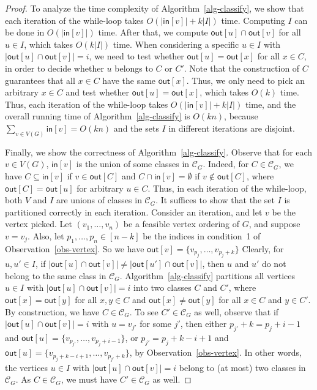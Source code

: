 \begin{proof}
To analyze the time complexity of Algorithm~\ref{alg-classify}, we show that each iteration of the while-loop takes $O(|\mathsf{in}[v]|+k|I|)$ time.
Computing $I$ can be done in $O(|\mathsf{in}[v]|)$ time.
After that, we compute $\mathsf{out}[u] \cap \mathsf{out}[v]$ for all $u \in I$, which takes $O(k|I|)$ time.
When considering a specific $u \in I$ with $|\mathsf{out}[u] \cap \mathsf{out}[v]| = i$, we need to test whether $\mathsf{out}[u] = \mathsf{out}[x]$ for all $x \in C$, in order to decide whether $u$ belongs to $C$ or $C'$.
Note that the construction of $C$ guarantees that all $x \in C$ have the same $\mathsf{out}[x]$.
Thus, we only need to pick an arbitrary $x \in C$ and test whether $\mathsf{out}[u] = \mathsf{out}[x]$, which takes $O(k)$ time.
Thus, each iteration of the while-loop takes $O(|\mathsf{in}[v]|+k|I|)$ time, and the overall running time of Algorithm~\ref{alg-classify} is $O(kn)$, because $\sum_{v \in V(G)} \mathsf{in}[v] = O(kn)$ and the sets $I$ in different iterations are disjoint.

Finally, we show the correctness of Algorithm~\ref{alg-classify}.
Observe that for each $v \in V(G)$, $\mathsf{in}[v]$ is the union of some classes in $\mathcal{C}_G$.
Indeed, for $C \in \mathcal{C}_G$, we have $C \subseteq \mathsf{in}[v]$ if $v \in \mathsf{out}[C]$ and $C \cap \mathsf{in}[v] = \emptyset$ if $v \not\in \mathsf{out}[C]$, where $\mathsf{out}[C] = \mathsf{out}[u]$ for arbitrary $u \in C$.
Thus, in each iteration of the while-loop, both $V$ and $I$ are unions of classes in $\mathcal{C}_G$.
It suffices to show that the set $I$ is partitioned correctly in each iteration.
Consider an iteration, and let $v$ be the vertex picked.
Let $(v_1,\dots,v_n)$ be a feasible vertex ordering of $G$, and suppose $v = v_j$.
Also, let $p_1,\dots,p_n \in [n-k]$ be the indices in condition~1 of Observation~\ref{obs-vertex}.
So we have $\mathsf{out}[v] = \{v_{p_j},\dots,v_{p_j+k}\}$
Clearly, for $u,u' \in I$, if $|\mathsf{out}[u] \cap \mathsf{out}[v]| \neq |\mathsf{out}[u'] \cap \mathsf{out}[v]|$, then $u$ and $u'$ do not belong to the same class in $\mathcal{C}_G$.
Algorithm~\ref{alg-classify} partitions all vertices $u \in I$ with $|\mathsf{out}[u] \cap \mathsf{out}[v]| = i$ into two classes $C$ and $C'$, where $\mathsf{out}[x] = \mathsf{out}[y]$ for all $x,y \in C$ and $\mathsf{out}[x] \neq \mathsf{out}[y]$ for all $x \in C$ and $y \in C'$.
By construction, we have $C \in \mathcal{C}_G$.
To see $C' \in \mathcal{C}_G$ as well, observe that if $|\mathsf{out}[u] \cap \mathsf{out}[v]| = i$ with $u = v_{j'}$ for some $j'$, then either $p_{j'} + k = p_j + i - 1$ and $\mathsf{out}[u] = \{v_{p_{j'}},\dots,v_{p_j+i-1}\}$, or $p_{j'} = p_j + k - i + 1$ and $\mathsf{out}[u] = \{v_{p_j+k-i+1},\dots,v_{p_{j'}+k}\}$, by Observation~\ref{obs-vertex}.
In other words, the vertices $u \in I$ with $|\mathsf{out}[u] \cap \mathsf{out}[v]| = i$ belong to (at most) two classes in $\mathcal{C}_G$.
As $C \in \mathcal{C}_G$, we must have $C' \in \mathcal{C}_G$ as well.
\end{proof}
